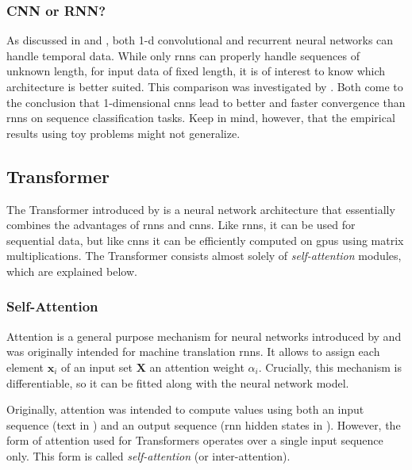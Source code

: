 \subsubsection{CNN or RNN?}

As discussed in  and , both 1-d convolutional and recurrent neural networks can handle temporal data. While only \glspl{rnn} can properly handle sequences of unknown length, for input data of fixed length, it is of interest to know which architecture is better suited. This comparison was investigated by \citet{2017arXiv170201923Y,2018arXiv180301271B}. Both come to the conclusion that 1-dimensional \glspl{cnn} lead to better and faster convergence than \glspl{rnn} on sequence classification tasks. Keep in mind, however, that the empirical results using toy problems might not generalize.


\subsection{Transformer}
\label{subsec:bg.tf}

The Transformer introduced by \citet{DBLP:conf/nips/VaswaniSPUJGKP17} is a neural network architecture that essentially combines the advantages of \glspl{rnn} and \glspl{cnn}. Like \glspl{rnn}, it can be used for sequential data, but like \glspl{cnn} it can be efficiently computed on \glspl{gpu} using matrix multiplications. The Transformer consists almost solely of \emph{self-attention} modules, which are explained below.

\subsubsection{Self-Attention}
Attention is a general purpose mechanism for neural networks introduced by \citet{DBLP:journals/corr/BahdanauCB14} and was originally intended for machine translation \glspl{rnn}. It allows to assign each element $\mathbf{x}_i$ of an input set $\mathbf{X}$ an attention weight $\alpha_i$. Crucially, this mechanism is differentiable, so it can be fitted along with the neural network model.

Originally, attention was intended to compute values using both an input sequence (text in \citet{DBLP:journals/corr/BahdanauCB14}) and an output sequence (\gls{rnn} hidden states in \citet{DBLP:journals/corr/BahdanauCB14}). However, the form of attention used for Transformers operates over a single input sequence only. This form is called \emph{self-attention} (or inter-attention).

